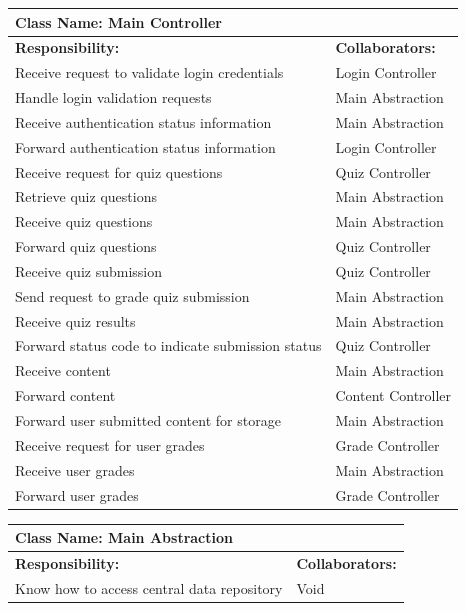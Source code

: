 \documentclass[]{article}
\begin{document}
	\begin{table}[H]
	\centering
		\begin{tabular}{|p{9cm}|p{3cm}|}
		\hline
		 \multicolumn{2}{|l|}{\textbf{Class Name: Main Controller}} \\
		\hline
		\textbf{Responsibility:} & \textbf{Collaborators:} \\
		\hline
	    Receive request to validate login credentials & Login Controller\\
		\hline
	    Handle login validation requests & Main Abstraction\\
		\hline
		Receive authentication status information & Main Abstraction\\
		\hline
		Forward authentication status information & Login Controller\\
		\hline
		Receive request for quiz questions & Quiz Controller\\
		\hline
		Retrieve quiz questions & Main Abstraction \\
		\hline
		Receive quiz questions & Main Abstraction\\
		\hline
		Forward quiz questions & Quiz Controller\\
		\hline
		Receive quiz submission & Quiz Controller\\
		\hline
		Send request to grade quiz submission & Main Abstraction\\
		\hline
		Receive quiz results & Main Abstraction\\
		\hline
		Forward status code to indicate submission status & Quiz Controller\\
		\hline
		Receive content & Main Abstraction\\
		\hline
		Forward content & Content Controller\\
		\hline
		Forward user submitted content for storage & Main Abstraction\\
		\hline
		Receive request for user grades & Grade Controller\\
		\hline
		Receive user grades & Main Abstraction\\
		\hline
		Forward user grades & Grade Controller\\
		\hline
		\end{tabular}
	\end{table}
	
	\begin{table}[H]
	\centering
		\begin{tabular}{|p{9cm}|p{3cm}|}
		\hline
		 \multicolumn{2}{|l|}{\textbf{Class Name: Main Abstraction}} \\
		\hline
		\textbf{Responsibility:} & \textbf{Collaborators:} \\
		\hline
		Know how to access central data repository & Void\\
		\hline
		\end{tabular}
	\end{table}
	
\end{document}
